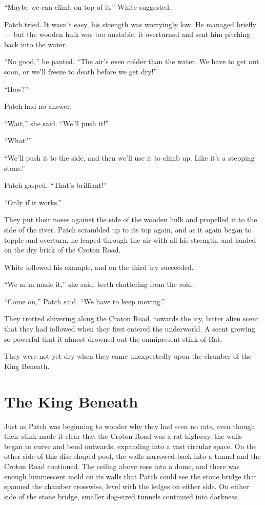 \documentclass[ebook,oneside,openany,17pt]{memoir}
\newenvironment{tolerant}[1]{%
  \par\tolerance=#1\relax
}{%
  \par
}
\renewcommand{\thechapter}{\Roman{chapter}}
\newcounter{sections}
\newcommand{\sections}[1]{%
  \section*{#1}
  \addtocounter{sections}{1}%
  \pdfbookmark[1]{#1}{section.\thechapter.\thesections}}
\begin{document}
“Maybe we can climb on top of it,” White suggested.

Patch tried. It wasn’t easy, his strength was worryingly low. He
managed briefly — but the wood\-en hulk was too unstable, it overturned
and sent him pitching back into the water.

“No good,” he panted. “The air’s even colder than the water. We have
to get out soon, or we’ll freeze to death before we get dry!”

“How?”

Patch had no answer.

“Wait,” she said. “We’ll push it!”

“What?”

“We’ll push it to the side, and then we’ll use it to climb up. Like
it’s a stepping stone.”

Patch gasped. “That’s brilliant!”

“Only if it works.”

\begin{tolerant}{500}
They put their noses against the side of the wood\-en hulk and propelled
it to the side of the river. Patch scrambled up to its top again, and
as it again began to topple and overturn, he leaped through the air
with all his strength, and landed on the dry brick of the Croton Road.
\end{tolerant}

White followed his example, and on the third try succeeded.

“We m-m-made it,” she said, teeth chattering from the cold.

“Come on,” Patch said. “We have to keep moving.”

They trotted shivering along the Croton Road, towards the icy, bitter
alien scent that they had followed when they first entered the
underworld. A scent growing so powerful that it almost drowned out the
omnipresent stink of Rat.

They were not yet dry when they came unexpectedly upon the chamber of
the King Beneath.


\sections{The King Beneath}

Just as Patch was beginning to wonder why they had seen no rats, even
though their stink made it clear that the Croton Road was a rat
highway, the walls began to curve and bend outwards, expanding into a
vast circular space. On the other side of this disc-shaped pool, the
walls narrowed back into a tunnel and the Croton Road continued. The
ceiling above rose into a dome, and there was enough luminescent mold
on its walls that Patch could see the stone bridge that spanned the
chamber crosswise, level with the ledges on either side. On either
side of the stone bridge, smaller dog-sized tunnels continued into
darkness.
\end{document}
